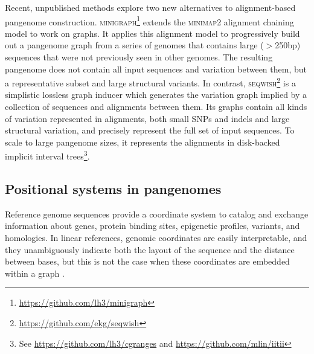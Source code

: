 Recent, unpublished methods explore two new alternatives to alignment-based pangenome construction.
\textsc{minigraph}\footnote{\url{https://github.com/lh3/minigraph}} extends the \textsc{minimap2} \cite{Li_2018} alignment chaining model to work on graphs.
It applies this alignment model to progressively build out a pangenome graph from a series of genomes that contains large ($>$250bp) sequences that were not previously seen in other genomes.
The resulting pangenome does not contain all input sequences and variation between them, but a representative subset and large structural variants.
In contrast, \textsc{seqwish}\footnote{\url{https://github.com/ekg/seqwish}} \cite{Garrison_2019} is a simplistic lossless graph inducer which generates the variation graph implied by a collection of sequences and alignments between them.
Its graphs contain all kinds of variation represented in alignments, both small SNPs and indels and large structural variation, and precisely represent the full set of input sequences.
To scale to large pangenome sizes, it represents the alignments in disk-backed implicit interval trees\footnote{See \url{https://github.com/lh3/cgranges} and \url{https://github.com/mlin/iitii}}.








\subsection{Positional systems in pangenomes}

Reference genome sequences provide a coordinate system to catalog and exchange information about genes, protein binding sites, epigenetic profiles, variants, and homologies.
In linear references, genomic coordinates are easily interpretable, and they unambiguously indicate both the layout of the sequence and the distance between bases, but this is not the case when these coordinates are embedded within a graph \cite{Rand_2017}.


